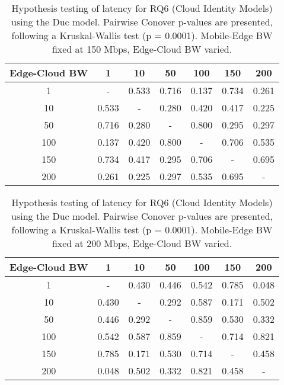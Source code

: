 \begin{table}[H]
\caption{Hypothesis testing of latency for RQ6 (Cloud Identity Models) using the Duc model. Pairwise Conover p-values are presented, following a Kruskal-Wallis test (p = 0.0001). Mobile-Edge BW fixed at 150 Mbps, Edge-Cloud BW varied.}
\centering
\begin{tabular}{c|cccccc}
Edge-Cloud BW & 1 & 10 & 50 & 100 & 150 & 200 \\
\hline
1 & - & 0.533 & 0.716 & 0.137 & 0.734 & 0.261 \\
10 & 0.533 & - & 0.280 & 0.420 & 0.417 & 0.225 \\
50 & 0.716 & 0.280 & - & 0.800 & 0.295 & 0.297 \\
100 & 0.137 & 0.420 & 0.800 & - & 0.706 & 0.535 \\
150 & 0.734 & 0.417 & 0.295 & 0.706 & - & 0.695 \\
200 & 0.261 & 0.225 & 0.297 & 0.535 & 0.695 & - \\
\end{tabular}
\end{table}

\begin{table}[H]
\caption{Hypothesis testing of latency for RQ6 (Cloud Identity Models) using the Duc model. Pairwise Conover p-values are presented, following a Kruskal-Wallis test (p = 0.0001). Mobile-Edge BW fixed at 200 Mbps, Edge-Cloud BW varied.}
\centering
\begin{tabular}{c|cccccc}
Edge-Cloud BW & 1 & 10 & 50 & 100 & 150 & 200 \\
\hline
1 & - & 0.430 & 0.446 & 0.542 & 0.785 & 0.048 \\
10 & 0.430 & - & 0.292 & 0.587 & 0.171 & 0.502 \\
50 & 0.446 & 0.292 & - & 0.859 & 0.530 & 0.332 \\
100 & 0.542 & 0.587 & 0.859 & - & 0.714 & 0.821 \\
150 & 0.785 & 0.171 & 0.530 & 0.714 & - & 0.458 \\
200 & 0.048 & 0.502 & 0.332 & 0.821 & 0.458 & - \\
\end{tabular}
\end{table}

